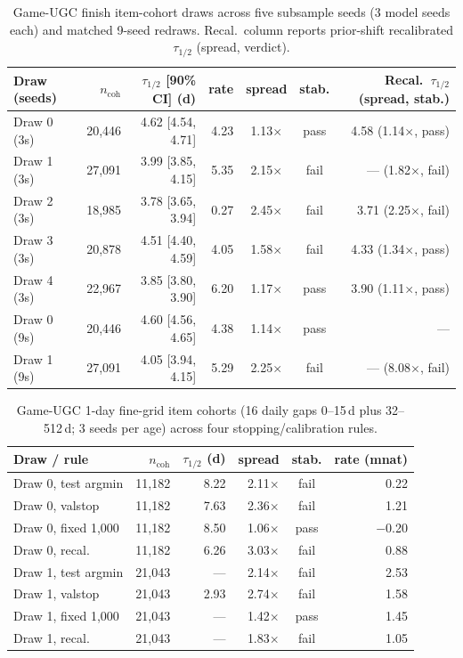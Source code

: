 \documentclass[10pt,letterpaper]{article}
\begin{document}
\begin{table}[t]
\centering
\caption{Game-UGC finish item-cohort draws across five subsample seeds (3
model seeds each) and matched 9-seed redraws. Recal.\ column reports
prior-shift recalibrated $\tau_{1/2}$ (spread, verdict).}
\label{tab:ugc_draws}
\small
\begin{tabular}{lrrrccr}
\toprule
Draw (seeds) & $n_{\mathrm{coh}}$ & $\tau_{1/2}$ [90\% CI] (d) & rate & spread & stab. & Recal.\ $\tau_{1/2}$ (spread, stab.) \\
\midrule
Draw 0 (3s) & 20{,}446 & 4.62 [4.54, 4.71] & 4.23 & 1.13$\times$ & pass & 4.58 (1.14$\times$, pass) \\
Draw 1 (3s) & 27{,}091 & 3.99 [3.85, 4.15] & 5.35 & 2.15$\times$ & fail & --- (1.82$\times$, fail) \\
Draw 2 (3s) & 18{,}985 & 3.78 [3.65, 3.94] & 0.27 & 2.45$\times$ & fail & 3.71 (2.25$\times$, fail) \\
Draw 3 (3s) & 20{,}878 & 4.51 [4.40, 4.59] & 4.05 & 1.58$\times$ & fail & 4.33 (1.34$\times$, pass) \\
Draw 4 (3s) & 22{,}967 & 3.85 [3.80, 3.90] & 6.20 & 1.17$\times$ & pass & 3.90 (1.11$\times$, pass) \\
\midrule
Draw 0 (9s) & 20{,}446 & 4.60 [4.56, 4.65] & 4.38 & 1.14$\times$ & pass & --- \\
Draw 1 (9s) & 27{,}091 & 4.05 [3.94, 4.15] & 5.29 & 2.25$\times$ & fail & --- (8.08$\times$, fail) \\
\bottomrule
\end{tabular}
\end{table}

\begin{table}[t]
\centering
\caption{Game-UGC 1-day fine-grid item cohorts (16 daily gaps 0--15\,d plus
32--512\,d; 3 seeds per age) across four stopping/calibration rules.}
\label{tab:ugc_finegrid}
\small
\begin{tabular}{lrrrcr}
\toprule
Draw / rule & $n_{\mathrm{coh}}$ & $\tau_{1/2}$ (d) & spread & stab. & rate (mnat) \\
\midrule
Draw 0, test argmin & 11{,}182 & 8.22 & 2.11$\times$ & fail & 0.22 \\
Draw 0, valstop     & 11{,}182 & 7.63 & 2.36$\times$ & fail & 1.21 \\
Draw 0, fixed 1,000 & 11{,}182 & 8.50 & 1.06$\times$ & pass & $-$0.20 \\
Draw 0, recal.      & 11{,}182 & 6.26 & 3.03$\times$ & fail & 0.88 \\
\midrule
Draw 1, test argmin & 21{,}043 & ---  & 2.14$\times$ & fail & 2.53 \\
Draw 1, valstop     & 21{,}043 & 2.93 & 2.74$\times$ & fail & 1.58 \\
Draw 1, fixed 1,000 & 21{,}043 & ---  & 1.42$\times$ & pass & 1.45 \\
Draw 1, recal.      & 21{,}043 & ---  & 1.83$\times$ & fail & 1.05 \\
\bottomrule
\end{tabular}
\end{table}
\end{document}
